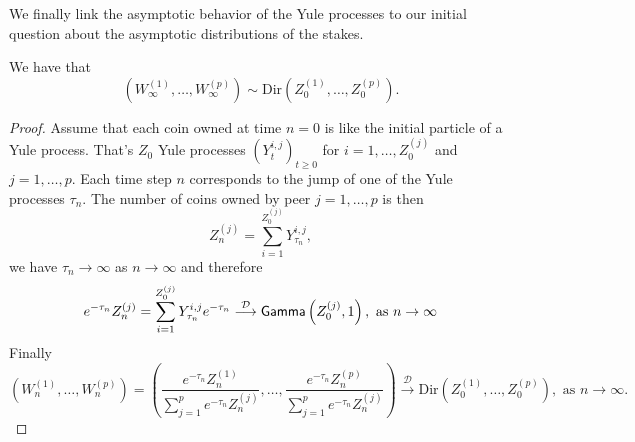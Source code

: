 We finally link the asymptotic behavior of the Yule processes to our initial question about the asymptotic distributions of the stakes.
\begin{theo}
We have that 
\[
\left(W_\infty^{(1)},\ldots, W_\infty^{(p)}\right)\sim\text{Dir}\left(Z_0^{(1)},\ldots, Z_0^{(p)}\right).
\]
\end{theo}
\begin{proof}
Assume that each coin owned at time $n=0$ is like the initial particle of a Yule process. That's $Z_0$ Yule processes $(Y_t^{i,j})_{t\geq0}$ for $i = 1, \ldots, Z_0^{(j)}$ and $j = 1,\ldots, p$. Each time step $n$ corresponds to the jump of one of the Yule processes $\tau_n$. The number of coins owned by peer $j=1,\ldots, p$ is then 
\[
Z_n^{(j)} = \sum_{i=1}^{Z_0^{(j)}} Y^{i,j}_{\tau_n},
\]
we have $\tau_n\rightarrow\infty$ as $n\rightarrow\infty$ and therefore 
\[
e^{-\tau_n}Z_n^{(j)} = \sum_{i=1}^{Z_0^{(j)}} Y^{i,j}_{\tau_n}e^{-\tau_n}\overset{\mathcal{D}}{\longrightarrow} \mathsf{Gamma}\left(Z_0^{(j)}, 1\right),\text{ as }n\rightarrow\infty
\]
Finally 
\[
\left(W_n^{(1)},\ldots, W_n^{(p)}\right) = \left(\frac{e^{-\tau_n}Z_n^{(1)}}{\sum_{j=1}^{p}e^{-\tau_n}Z_n^{(j)}},\ldots, \frac{e^{-\tau_n}Z_n^{(p)}}{\sum_{j=1}^{p}e^{-\tau_n}Z_n^{(j)}}\right)\overset{\mathcal{D}}{\longrightarrow}\text{Dir}(Z_0^{(1)},\ldots, Z_0^{(p)})
,\text{ as }n\rightarrow\infty.
\]
\end{proof}
